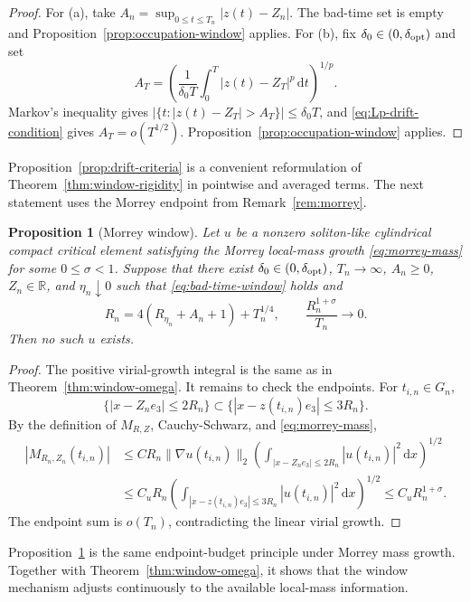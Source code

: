 \documentclass[preprint,12pt]{elsarticle}
\numberwithin{equation}{section}
\newcommand{\R}{\mathbb R}
\newcommand{\dd}{\,\mathrm d}
\newcommand{\na}{\nabla}
\newcommand{\ez}{e_3}
\newtheorem{proposition}[theorem]{Proposition}
\theoremstyle{remark}
\begin{document}
\begin{proof}
For (a), take $A_n=\sup_{0\le t\le T_n}|z(t)-Z_n|$.  The bad-time set is empty and Proposition~\ref{prop:occupation-window} applies.  For (b), fix $\delta_0\in(0,\delta_{\rm opt})$ and set
\[
  A_T=\left(\frac{1}{\delta_0T}\int_0^T|z(t)-Z_T|^p\dd t\right)^{1/p}.
\]
Markov's inequality gives $|\{t: |z(t)-Z_T|>A_T\}|\le\delta_0T$, and \eqref{eq:Lp-drift-condition} gives $A_T=o(T^{1/2})$.  Proposition~\ref{prop:occupation-window} applies.
\end{proof}

Proposition~\ref{prop:drift-criteria} is a convenient reformulation of Theorem~\ref{thm:window-rigidity} in pointwise and averaged terms.  The next statement uses the Morrey endpoint from Remark~\ref{rem:morrey}.

\begin{proposition}[Morrey window]\label{prop:morrey-window}
Let $u$ be a nonzero soliton-like cylindrical compact critical element satisfying the Morrey local-mass growth \eqref{eq:morrey-mass} for some $0\le\sigma<1$.  Suppose that there exist $\delta_0\in(0,\delta_{\rm opt})$, $T_n\to\infty$, $A_n\ge0$, $Z_n\in\R$, and $\eta_n\downarrow0$ such that \eqref{eq:bad-time-window} holds and
\[
  R_n=4(R_{\eta_n}+A_n+1)+T_n^{1/4},
  \qquad \frac{R_n^{1+\sigma}}{T_n}\to0.
\]
Then no such $u$ exists.
\end{proposition}

\begin{proof}
The positive virial-growth integral is the same as in Theorem~\ref{thm:window-omega}.  It remains to check the endpoints.  For $t_{i,n}\in G_n$,
\[
  \{|x-Z_n\ez|\le2R_n\}\subset\{|x-z(t_{i,n})\ez|\le3R_n\}.
\]
By the definition of $M_{R,Z}$, Cauchy-Schwarz, and \eqref{eq:morrey-mass},
\begin{align*}
  |M_{R_n,Z_n}(t_{i,n})|
  &\le C R_n\|\na u(t_{i,n})\|_2
      \left(\int_{|x-Z_n\ez|\le2R_n}|u(t_{i,n})|^2\dd x\right)^{1/2} \\
  &\le C_u R_n
      \left(\int_{|x-z(t_{i,n})\ez|\le3R_n}|u(t_{i,n})|^2\dd x\right)^{1/2}
  \le C_u R_n^{1+\sigma}.
\end{align*}
The endpoint sum is $o(T_n)$, contradicting the linear virial growth.
\end{proof}

Proposition~\ref{prop:morrey-window} is the same endpoint-budget principle under Morrey mass growth.  Together with Theorem~\ref{thm:window-omega}, it shows that the window mechanism adjusts continuously to the available local-mass information.
\end{document}
